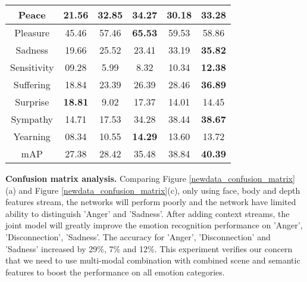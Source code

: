 \documentclass[conference]{IEEEtran}
\begin{document}
\begin{table}[!ht]
\begin{minipage}[t]{\linewidth}
{\begin{tabular}{| c | c | c | c | c | c |  }
\hline
 Peace & 21.56 & 32.85 & \textbf{34.27} & 30.18&  33.28\\ 
\hline
 Pleasure &  45.46& 57.46 &\textbf{65.53}  & 59.53& 58.86\\ 
\hline
 Sadness &  19.66& 25.52 & 23.41 & 33.19& \textbf{35.82} \\ 
\hline
 Sensitivity & 09.28 &5.99  &8.32  & 10.34 & \textbf{12.38}\\ 
\hline
 Suffering & 18.84 &23.39  & 26.39 & 28.46& \textbf{36.89} \\ 
\hline
 Surprise & \textbf{18.81} & 9.02 & 17.37 &14.01 &14.45  \\ 
\hline
 Sympathy &14.71  &17.53  & 34.28 &38.44 & \textbf{38.67}  \\ 
\hline
 Yearning &08.34  &10.55  & \textbf{14.29} & 13.60 &13.72 \\ 
\hline
mAP & 27.38 & 28.42 & 35.48 & 38.84& \textbf{40.39}  \\
\hline
\end{tabular}}
 \label{results-for-methods}
 \end{minipage}
\end{table}

\begin{table}[!ht]
\centering
\caption{We analyse our findings using the common Average Precision (AP) metric, and we compare our results with previous results for four basic emotion categories on new dataset}
\label{results-for-methods-newdataset}
\end{table}
 
 \textbf{Confusion matrix analysis.} Comparing Figure \ref{newdata_confusion_matrix}(a) and Figure \ref{newdata_confusion_matrix}(c), only using face, body and depth features stream, the networks will perform poorly and  the network have limited ability to distinguish 'Anger' and 'Sadness'. After  adding context streams, the joint model will greatly improve the emotion recognition performance on 'Anger', 'Disconnection', 'Sadness'.  The accuracy for 'Anger', 'Disconnection' and 'Sadness' increased by 29\%, 7\% and 12\%. This experiment verifies our concern that we need to use multi-modal combination  with combined scene and semantic features to boost the performance on all emotion categories.
\end{document}
